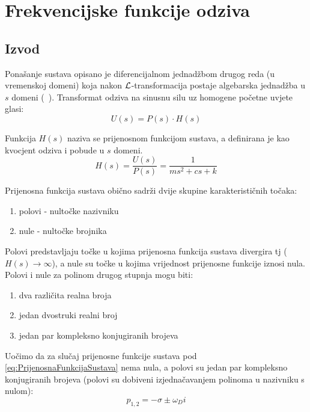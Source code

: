 \section{Frekvencijske funkcije odziva}
\subsection{Izvod}
Ponašanje sustava opisano je diferencijalnom jednadžbom drugog reda (u vremenskoj
domeni) koja nakon $\mathcal{L}$-transformacija postaje algebarska jednadžba u $s$ domeni (~\cite{sisbabic}).
Transformat odziva na sinusnu silu uz homogene početne uvjete glasi:
\begin{equation}
    U(s) = P(s)\cdot H(s) 
\end{equation}

Funkcija $H(s)$ naziva se prijenosnom funkcijom sustava, a definirana je kao
kvocjent odziva i pobude u $s$ domeni.
\begin{equation} \label{eq:PrijenosnaFunkcijaSustava}
    H(s)=\frac{U(s)}{P(s)} = \frac{1}{ms^2+cs+k}%
\end{equation}

Prijenosna funkcija sustava obično sadrži dvije skupine karakterističnih točaka:
\begin{enumerate}
    \item polovi - nultočke nazivniku
    \item nule - nultočke brojnika
\end{enumerate}

Polovi predstavljaju točke u kojima prijenosna funkcija sustava divergira tj
($H(s)\to\infty$), a nule su točke u kojima vrijednost prijenosne funkcije iznosi
nula. Polovi i nule za polinom drugog stupnja mogu biti:
\begin{enumerate}
    \item dva različita realna broja
    \item jedan dvostruki realni broj
    \item jedan par kompleksno konjugiranih brojeva
\end{enumerate}

Uočimo da za slučaj prijenosne funkcije sustava pod
\eqref{eq:PrijenosnaFunkcijaSustava} nema nula, a polovi su jedan par kompleksno
konjugiranih brojeva (polovi su dobiveni izjednačavanjem polinoma u nazivniku s
nulom):
\begin{equation}
    p_{1,2} = -\sigma\pm\omega_Di
\end{equation}


